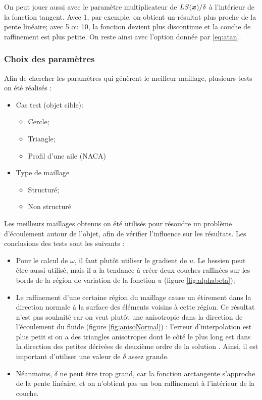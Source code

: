 \indent

\indent On peut jouer aussi avec le paramètre multiplicateur de \(LS(\boldsymbol{x})/\delta\) à l'intérieur de la fonction tangent. Avec 1, par exemple, on obtient un résultat plus proche de la pente linéaire; avec 5 ou 10, la fonction devient plus discontinue et la couche de raffinement est plus petite. On reste ainsi avec l'option donnée par \eqref{eq:atan}.



\subsubsection{Choix des paramètres}

\indent Afin de chercher les paramètres qui génèrent le meilleur maillage, plusieurs tests on été réalisés : 

\begin{itemize}
	\item Cas test (objet cible): 
	\begin{itemize}
		\item Cercle;
		\item Triangle;
		\item Profil d'une aile (NACA)
	\end{itemize}
	\item Type de maillage
	\begin{itemize}
		\item Structuré;
		\item Non structuré
	\end{itemize}
\end{itemize}

\indent Les meilleurs maillages obtenus on été utilisés pour résoudre un problème d'écoulement autour de l'objet, afin de vérifier l'influence sur les résultats. Les conclusions des tests sont les suivants : 

\begin{itemize}
  \item Pour le calcul de \(\omega\), il faut plutôt utiliser le gradient de \(u\). Le hessien peut être aussi utilisé, mais il a la tendance à créer deux couches raffinées sur les bords de la région de variation de la fonction \(u\) (figure \ref{fig:alphabeta});
  \item Le raffinement d'une certaine région du maillage cause un étirement dans la direction normale à la surface des éléments voisins à cette région. Ce résultat n'est pas souhaité car on veut plutôt une anisotropie dans la direction de l'écoulement du fluide (figure \ref{fig:anisoNormal}) : l'erreur d'interpolation est plus petit si on a des triangles anisotropes dont le côté le plus long est dans la direction des petites dérivées de deuxième ordre de la solution \cite{rippa}. Ainsi, il est important d'utiliser une valeur de \(\delta\) assez grande.
  \item Néanmoins, \(\delta\) ne peut être trop grand, car la fonction arctangente s'approche de la pente linéaire, et on n'obtient pas un bon raffinement à l'intérieur de la couche.
\end{itemize}


